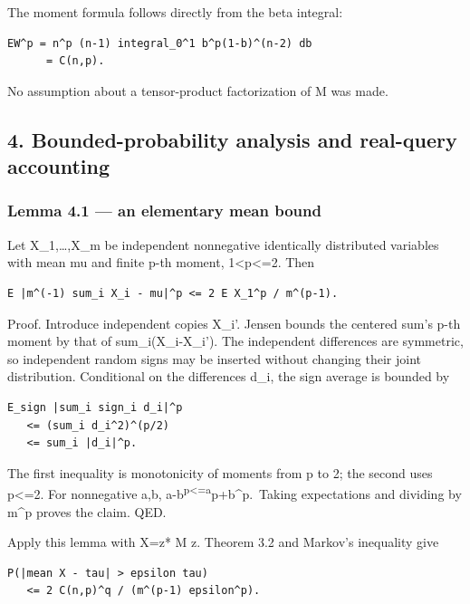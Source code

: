 \documentclass[
  10pt,
]{article}
\begin{document}
The moment formula follows directly from the beta integral:

\begin{verbatim}
EW^p = n^p (n-1) integral_0^1 b^p(1-b)^(n-2) db
      = C(n,p).
\end{verbatim}

No assumption about a tensor-product factorization of M was made.

\subsection{4. Bounded-probability analysis and real-query
accounting}\label{bounded-probability-analysis-and-real-query-accounting}

\subsubsection{Lemma 4.1 --- an elementary mean
bound}\label{lemma-4.1-an-elementary-mean-bound}

Let X\_1,\ldots,X\_m be independent nonnegative identically distributed
variables with mean mu and finite p-th moment, 1\textless p\textless=2.
Then

\begin{verbatim}
E |m^(-1) sum_i X_i - mu|^p <= 2 E X_1^p / m^(p-1).
\end{verbatim}

Proof. Introduce independent copies X\_i'. Jensen bounds the centered
sum's p-th moment by that of sum\_i(X\_i-X\_i'). The independent
differences are symmetric, so independent random signs may be inserted
without changing their joint distribution. Conditional on the
differences d\_i, the sign average is bounded by

\begin{verbatim}
E_sign |sum_i sign_i d_i|^p
   <= (sum_i d_i^2)^(p/2)
   <= sum_i |d_i|^p.
\end{verbatim}

The first inequality is monotonicity of moments from p to 2; the second
uses p\textless=2. For nonnegative a,b,
\textbar a-b\textbar{}\textsuperscript{p\textless=a}p+b\^{}p.~Taking
expectations and dividing by m\^{}p proves the claim. QED.

Apply this lemma with X=z* M z. Theorem 3.2 and Markov's inequality give

\begin{verbatim}
P(|mean X - tau| > epsilon tau)
   <= 2 C(n,p)^q / (m^(p-1) epsilon^p).
\end{verbatim}
\end{document}
